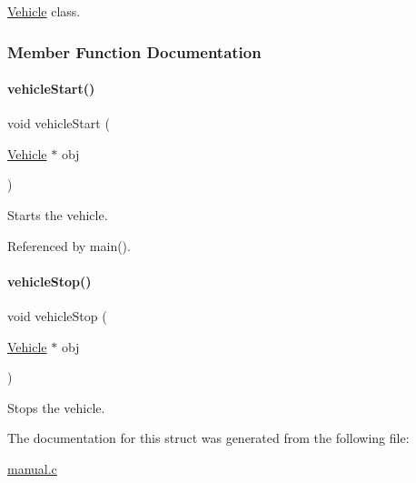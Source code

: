 \hyperlink{struct_vehicle}{Vehicle} class. 

\subsubsection{Member Function Documentation}
\mbox{\label{struct_vehicle_a6891d3d28853bc3fdd075596dc6de9f8}} 
\paragraph{\texorpdfstring{vehicle\+Start()}{vehicleStart()}}
{\footnotesize\ttfamily void vehicle\+Start (\begin{DoxyParamCaption}\item[{\hyperlink{struct_vehicle}{Vehicle} $\ast$}]{obj }\end{DoxyParamCaption})}

Starts the vehicle. 

Referenced by main().

\mbox{\label{struct_vehicle_a4dcbcba43792dcd673a552b14479ab77}} 
\paragraph{\texorpdfstring{vehicle\+Stop()}{vehicleStop()}}
{\footnotesize\ttfamily void vehicle\+Stop (\begin{DoxyParamCaption}\item[{\hyperlink{struct_vehicle}{Vehicle} $\ast$}]{obj }\end{DoxyParamCaption})}

Stops the vehicle. 

The documentation for this struct was generated from the following file\+:\begin{DoxyCompactItemize}
\item 
\hyperlink{manual_8c}{manual.\+c}\end{DoxyCompactItemize}

